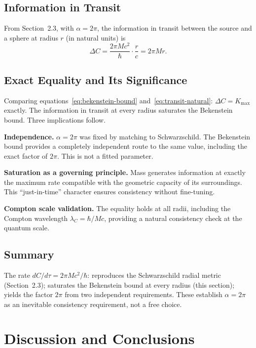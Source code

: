 \documentclass[12pt]{article}
\begin{document}
\subsection{Information in Transit}

From Section~2.3, with $\alpha = 2\pi$, the information in transit
between the source and a sphere at radius $r$ (in natural units) is
\begin{equation}
  \Delta C = \frac{2\pi Mc^2}{\hbar}\cdot\frac{r}{c} = 2\pi Mr.
  \label{eq:transit-natural}
\end{equation}

\subsection{Exact Equality and Its Significance}

Comparing equations~\eqref{eq:bekenstein-bound}
and~\eqref{eq:transit-natural}: $\Delta C = K_{\max}$ exactly.
The information in transit at every radius saturates the Bekenstein
bound.
Three implications follow.

\medskip
\noindent\textbf{Independence.}
$\alpha = 2\pi$ was fixed by matching to Schwarzschild.
The Bekenstein bound provides a completely independent route to the
same value, including the exact factor of $2\pi$.
This is not a fitted parameter.

\medskip
\noindent\textbf{Saturation as a governing principle.}
Mass generates information at exactly the maximum rate compatible with
the geometric capacity of its surroundings.
This ``just-in-time'' character ensures consistency without fine-tuning.

\medskip
\noindent\textbf{Compton scale validation.}
The equality holds at all radii, including the Compton wavelength
$\lambda_C = \hbar/Mc$, providing a natural consistency check at the
quantum scale.

\subsection{Summary}

The rate $dC/d\tau = 2\pi Mc^2/\hbar$: reproduces the Schwarzschild
radial metric (Section~2.3); saturates the Bekenstein bound at every
radius (this section); yields the factor $2\pi$ from two independent
requirements.
These establish $\alpha = 2\pi$ as an inevitable consistency
requirement, not a free choice.

\section{Discussion and Conclusions}
\end{document}
